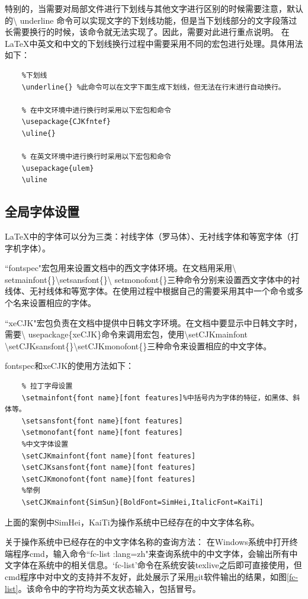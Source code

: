 \documentclass[12pt]{book}
\begin{document}
特别的，当需要对局部文件进行下划线与其他文字进行区别的时候需要注意，默认的\textbackslash
underline
命令可以实现文字的下划线功能，但是当下划线部分的文字段落过长需要换行的时候，该命令就无法实现了。因此，需要对此进行重点说明。
在\LaTeX{}中英文和中文的下划线换行过程中需要采用不同的宏包进行处理。具体用法如下：
\begin{verbatim}
    %下划线
    \underline{} %此命令可以在文字下面生成下划线，但无法在行末进行自动换行。
    
    % 在中文环境中进行换行时采用以下宏包和命令
    \usepackage{CJKfntef} 
    \uline{} 
    
    % 在英文环境中进行换行时采用以下宏包和命令
    \usepackage{ulem}
    \uline
\end{verbatim}

\subsection{全局字体设置}

\LaTeX{}中的字体可以分为三类：衬线字体（罗马体）、无衬线字体和等宽字体（打字机字体）。

``fontspec"宏包用来设置文档中的西文字体环境。在文档用采用\textbackslash
setmainfont\{\}\textbackslash setsansfont\{\}\textbackslash
setmonofont\{\}三种命令分别来设置西文字体中的衬线体、无衬线体和等宽字体。在使用过程中根据自己的需要采用其中一个命令或多个名来设置相应的字体。

``xeCJK"宏包负责在文档中提供中日韩文字环境。在文档中要显示中日韩文字时，需要\textbackslash
usepackage\{xeCJK\}命令来调用宏包，使用\textbackslash setCJKmainfont
\textbackslash setCJKsansfont\{\}\textbackslash setCJKmonofont\{\}三种命令来设置相应的中文字体。

fontspec和xeCJK的使用方法如下：

\begin{verbatim}
    % 拉丁字母设置
    \setmainfont{font name}[font features]%中括号内为字体的特征，如黑体、斜体等。
    \setsansfont{font name}[font features]
    \setmonofant{font name}[font features]
    %中文字体设置
    \setCJKmainfont{font name}[font features]
    \setCJKsansfont{font name}[font features]
    \setCJKmonofont{font name}[font features]
    %举例
    \setCJKmainfont{SimSun}[BoldFont=SimHei,ItalicFont=KaiTi]
\end{verbatim}

上面的案例中SimHei，KaiTi为操作系统中已经存在的中文字体名称。

关于操作系统中已经存在的中文字体名称的查询方法：
在Windows系统中打开终端程序cmd，输入命令``fc-list :lang=zh"来查询系统中的中文字体，会输出所有中文字体在系统中的相关信息。`fc-list'命令在系统安装texlive之后即可直接使用，但cmd程序中对中文的支持并不友好，此处展示了采用git软件输出的结果，如图\ref{fc-list}。该命令中的字符均为英文状态输入，包括冒号。
\end{document}
